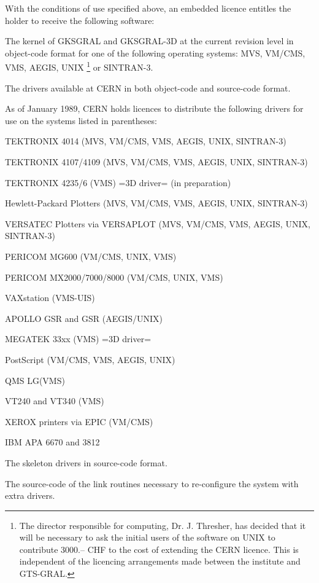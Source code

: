 With the conditions of use specified above, an embedded licence
entitles the holder to receive the following software:
\begin{OL}
\item The kernel of GKSGRAL and GKSGRAL-3D at the current revision level
in object-code format for one of the following operating systems:
MVS, VM/CMS, VMS, AEGIS, UNIX%
\footnote{%
The director responsible for computing, Dr. J. Thresher, has decided
that it will be necessary to ask the initial users of the software on
UNIX to contribute 3000.-- CHF to the cost of extending the CERN
licence. This is independent of the licencing arrangements made
between the institute and GTS-GRAL.}
or SINTRAN-3.
\item
{}
The drivers available at CERN%
in both object-code and source-code format.
 
As of January 1989, CERN holds licences to distribute
the following drivers
for use on the systems listed in parentheses:
\begin{UL}
\item TEKTRONIX 4014 (MVS, VM/CMS, VMS, AEGIS, UNIX, SINTRAN-3)
\item TEKTRONIX 4107/4109 (MVS, VM/CMS, VMS, AEGIS, UNIX, SINTRAN-3)
\item TEKTRONIX 4235/6 (VMS) =3D driver= (in preparation)
\item Hewlett-Packard Plotters (MVS, VM/CMS, VMS, AEGIS, UNIX, SINTRAN-3)
\item VERSATEC Plotters via VERSAPLOT (MVS, VM/CMS, VMS, AEGIS, UNIX, SINTRAN-3)
\item PERICOM MG600 (VM/CMS, UNIX, VMS)
\item PERICOM MX2000/7000/8000 (VM/CMS, UNIX, VMS)
\item VAXstation (VMS-UIS)
\item APOLLO GSR and GSR (AEGIS/UNIX)
\item MEGATEK 33xx (VMS) =3D driver=
\item PostScript (VM/CMS, VMS, AEGIS, UNIX)
\item QMS LG(VMS)
\item VT240 and VT340 (VMS)
\item XEROX printers via EPIC (VM/CMS)
\item IBM APA 6670 and 3812
\end{UL}
\item The skeleton drivers in source-code format.
\item The source-code of the link routines necessary to re-configure
the system with extra drivers.
\end{OL}
 
